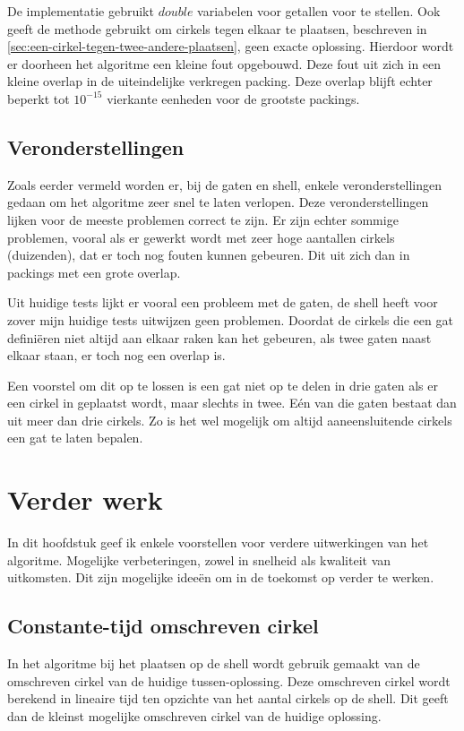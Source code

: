 \documentclass[12pt,a4paper,oneside]{book}
\begin{document}
De implementatie gebruikt $double$ variabelen voor getallen voor te stellen.
Ook geeft de methode gebruikt om cirkels tegen elkaar te plaatsen, beschreven in \autoref{sec:een-cirkel-tegen-twee-andere-plaatsen}, geen exacte oplossing.
Hierdoor wordt er doorheen het algoritme een kleine fout opgebouwd.
Deze fout uit zich in een kleine overlap in de uiteindelijke verkregen packing.
Deze overlap blijft echter beperkt tot $10^{-15}$ vierkante eenheden voor de grootste packings.

\section{Veronderstellingen}

Zoals eerder vermeld worden er, bij de gaten en shell, enkele veronderstellingen gedaan om het algoritme zeer snel te laten verlopen.
Deze veronderstellingen lijken voor de meeste problemen correct te zijn.
Er zijn echter sommige problemen, vooral als er gewerkt wordt met zeer hoge aantallen cirkels (duizenden), dat er toch nog fouten kunnen gebeuren.
Dit uit zich dan in packings met een grote overlap.

Uit huidige tests lijkt er vooral een probleem met de gaten, de shell heeft voor zover mijn huidige tests uitwijzen geen problemen.
Doordat de cirkels die een gat definiëren niet altijd aan elkaar raken kan het gebeuren, als twee gaten naast elkaar staan, er toch nog een overlap is.

Een voorstel om dit op te lossen is een gat niet op te delen in drie gaten als er een cirkel in geplaatst wordt, maar slechts in twee.
Eén van die gaten bestaat dan uit meer dan drie cirkels.
Zo is het wel mogelijk om altijd aaneensluitende cirkels een gat te laten bepalen.

\chapter{Verder werk} \label{chap:verder-werk}

In dit hoofdstuk geef ik enkele voorstellen voor verdere uitwerkingen van het algoritme.
Mogelijke verbeteringen, zowel in snelheid als kwaliteit van uitkomsten.
Dit zijn mogelijke ideeën om in de toekomst op verder te werken.

\section{Constante-tijd omschreven cirkel}

In het algoritme bij het plaatsen op de shell wordt gebruik gemaakt van de omschreven cirkel van de huidige tussen-oplossing.
Deze omschreven cirkel wordt berekend in lineaire tijd ten opzichte van het aantal cirkels op de shell.
Dit geeft dan de kleinst mogelijke omschreven cirkel van de huidige oplossing.
\end{document}
